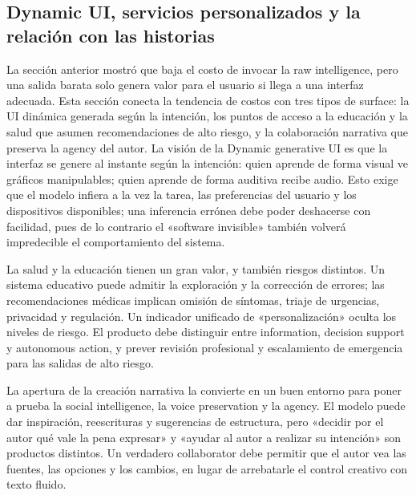 \subsection{Dynamic UI, servicios personalizados y la relación con las historias}

La sección anterior mostró que baja el costo de invocar la raw intelligence, pero una salida barata solo genera valor para el usuario si llega a una interfaz adecuada. Esta sección conecta la tendencia de costos con tres tipos de surface: la UI dinámica generada según la intención, los puntos de acceso a la educación y la salud que asumen recomendaciones de alto riesgo, y la colaboración narrativa que preserva la agency del autor. La visión de la Dynamic generative UI es que la interfaz se genere al instante según la intención: quien aprende de forma visual ve gráficos manipulables; quien aprende de forma auditiva recibe audio. Esto exige que el modelo infiera a la vez la tarea, las preferencias del usuario y los dispositivos disponibles; una inferencia errónea debe poder deshacerse con facilidad, pues de lo contrario el «software invisible» también volverá impredecible el comportamiento del sistema.



La salud y la educación tienen un gran valor, y también riesgos distintos. Un sistema educativo puede admitir la exploración y la corrección de errores; las recomendaciones médicas implican omisión de síntomas, triaje de urgencias, privacidad y regulación. Un indicador unificado de «personalización» oculta los niveles de riesgo. El producto debe distinguir entre information, decision support y autonomous action, y prever revisión profesional y escalamiento de emergencia para las salidas de alto riesgo.


La apertura de la creación narrativa la convierte en un buen entorno para poner a prueba la social intelligence, la voice preservation y la agency. El modelo puede dar inspiración, reescrituras y sugerencias de estructura, pero «decidir por el autor qué vale la pena expresar» y «ayudar al autor a realizar su intención» son productos distintos. Un verdadero collaborator debe permitir que el autor vea las fuentes, las opciones y los cambios, en lugar de arrebatarle el control creativo con texto fluido.

